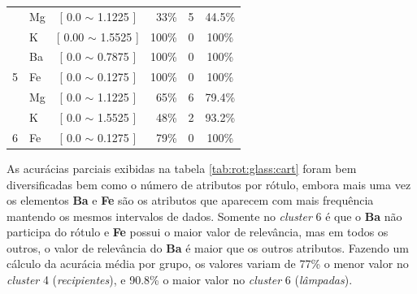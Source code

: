 \begin{table}[!h]
{\begin{tabular}{llcrcc}
                                            & Mg    & [ 0.0 $\sim$  1.1225 ]     & 33\%  & 5  & 44.5\% \\ 
                                            & K     & [ 0.00 $\sim$ 1.5525 ]     & 100\%  & 0 & 100\% \\ 
                                            & Ba     & [ 0.0 $\sim$  0.7875 ]    & 100\%  & 0 & 100\% \\  
\multirow{-4}{*}{5}                         & Fe    & [ 0.0 $\sim$  0.1275 ]     & 100\%  & 0 & 100\% \\  \hline
                                            & Mg    & [ 0.0 $\sim$  1.1225 ]     & 65\%  & 6  & 79.4\% \\ 
                                            & K     & [ 0.0 $\sim$ 1.5525 ]      & 48\%  & 2  & 93.2\% \\ 
\multirow{-3}{*}{6}                         & Fe    & [ 0.0 $\sim$  0.1275 ]     & 79\%  & 0  & 100\% \\  \hline

\end{tabular}
}
\end{table}

As acurácias parciais exibidas na tabela \ref{tab:rot:glass:cart} foram bem diversificadas bem como o número de atributos por rótulo, embora mais uma vez os elementos \textbf{Ba} e \textbf{Fe} são os atributos que aparecem com mais frequência mantendo os mesmos intervalos de dados. Somente no \textit{cluster} 6 é que o \textbf{Ba} não participa do rótulo e \textbf{Fe} possui o maior valor de relevância, mas em todos os outros, o valor de relevância do \textbf{Ba} é maior que os outros atributos. Fazendo um cálculo da acurácia média por grupo, os valores variam de 77\% o menor valor no \textit{cluster} 4  (\textit{recipientes}), e 90.8\% o maior valor no \textit{cluster} 6 (\textit{lâmpadas}).






